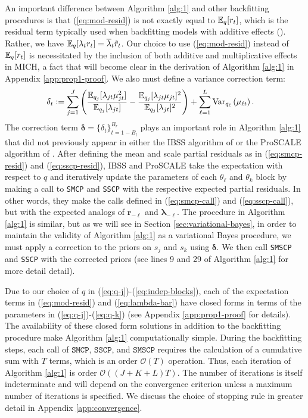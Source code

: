 An important difference between Algorithm \ref{alg:1} and other backfitting procedures is that (\ref{eq:mod-resid}) is not exactly equal to $\mathbb{E}_q[r_t]$, which is the residual term typically used when backfitting models with additive effects (\citealp{Breiman85,Hastie90,Friedman00,Wang20}). Rather, we have $\mathbb{E}_q[\lambda_t r_t] = \overline{\lambda}_t \tilde{r}_t$. Our choice to use (\ref{eq:mod-resid}) instead of $\mathbb{E}_q[r_t]$ is necessitated by the inclusion of both additive and multiplicative effects in MICH, a fact that will become clear in the derivation of Algorithm \ref{alg:1} in Appendix \ref{app:prop1-proof}. We also must define a variance correction term:
\begin{align}\label{eq:delta}
    \delta_t &:= \sum_{j=1}^J\left(\frac{\mathbb{E}_{q_j}[\lambda_{jt} \mu^2_{jt}]}{\mathbb{E}_{q_j}[\lambda_{jt}]} -\frac{\mathbb{E}_{q_j}[\lambda_{jt} \mu_{jt}]^2}{\mathbb{E}_{q_j}[\lambda_{jt}]^2} \right) +\sum_{\ell=1}^L  \text{Var}_{q_\ell}\left(\mu_{\ell t} \right).
\end{align}
The correction term $\pmb{\delta} = \{\delta_{t}\}_{t=1-B_l}^{B_r}$ plays an important role in Algorithm \ref{alg:1} that did not previously appear in either the IBSS algorithm of \cite{Wang20} or the ProSCALE algorithm of \cite{Cappello22}. After defining the mean and scale partial residuals as in (\ref{eq:smcp-resid}) and (\ref{eq:sscp-resid}), IBSS and ProSCALE take the expectation with respect to $q$ and iteratively update the parameters of each $\theta_\ell$ and $\theta_k$ block by making a call to \texttt{SMCP} and \texttt{SSCP} with the respective expected partial residuals. In other words, they make the calls defined in (\ref{eq:smcp-call}) and (\ref{eq:sscp-call}), but with the expected analogs of $\mathbf{r}_{-\ell}$ and $\pmb{\lambda}_{-\ell}$. The procedure in Algorithm \ref{alg:1} is similar, but as we will see in Section \ref{sec:variational-bayes}, in order to maintain the validity of Algorithm \ref{alg:1} as a variational Bayes procedure, we must apply a correction to the priors on $s_j$ and $s_k$ using $\pmb{\delta}$. We then call \texttt{SMSCP} and \texttt{SSCP} with the corrected priors (see lines 9 and 29 of Algorithm \ref{alg:1} for more detail detail). 

Due to our choice of $q$ in (\ref{eq:q-j})-(\ref{eq:indep-blocks}), each of the expectation terms in (\ref{eq:mod-resid}) and (\ref{eq:lambda-bar}) have closed forms in terms of the parameters in (\ref{eq:q-j})-(\ref{eq:q-k}) (see Appendix \ref{app:prop1-proof} for details). The availability of these closed form solutions in addition to the backfitting procedure make Algorithm \ref{alg:1} computationally simple. During the backfitting steps, each call of $\texttt{SMCP}$, $\texttt{SSCP}$, and $\texttt{SMSCP}$  requires the calculation of a cumulative sum with $T$ terms, which is an order $\mathcal{O}(T)$ operation. Thus, each iteration of Algorithm \ref{alg:1} is order $\mathcal{O}((J+K+L)T)$. The number of iterations is itself indeterminate and will depend on the convergence criterion unless a maximum number of iterations is specified. We discuss the choice of stopping rule in greater detail in Appendix \ref{app:convergence}.  

